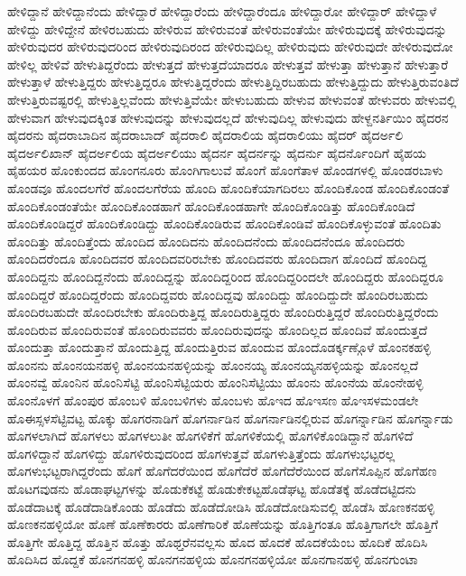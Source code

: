 {ಹೇಳಿದ್ದಾನೆ
ಹೇಳಿದ್ದಾನೆಂದು
ಹೇಳಿದ್ದಾರೆ
ಹೇಳಿದ್ದಾರೆಂದು
ಹೇಳಿದ್ದಾರೆಂದೂ
ಹೇಳಿದ್ದಾರೋ
ಹೇಳಿದ್ದಾರ್
ಹೇಳಿದ್ದಾಳೆ
ಹೇಳಿದ್ದು
ಹೇಳಿದ್ದೇನೆ
ಹೇಳಿರಬಹುದು
ಹೇಳಿರುವ
ಹೇಳಿರುವಂತೆ
ಹೇಳಿರುವಂತೆಯೇ
ಹೇಳಿರುವುದಕ್ಕೆ
ಹೇಳಿರುವುದನ್ನು
ಹೇಳಿರುವುದರ
ಹೇಳಿರುವುದರಿಂದ
ಹೇಳಿರುವುದಿರಂದ
ಹೇಳಿರುವುದಿಲ್ಲ
ಹೇಳಿರುವುದು
ಹೇಳಿರುವುದೇ
ಹೇಳಿರುವುದೋ
ಹೇಳಿಲ್ಲ
ಹೇಳಿವೆ
ಹೇಳುತಿದ್ದರೆಂದು
ಹೇಳುತ್ತದೆ
ಹೇಳುತ್ತದೆಯಾದರೂ
ಹೇಳುತ್ತವೆ
ಹೇಳುತ್ತಾ
ಹೇಳುತ್ತಾನೆ
ಹೇಳುತ್ತಾರೆ
ಹೇಳುತ್ತಾಳೆ
ಹೇಳುತ್ತಿದ್ದರು
ಹೇಳುತ್ತಿದ್ದರೂ
ಹೇಳುತ್ತಿದ್ದರೆಂದು
ಹೇಳುತ್ತಿದ್ದಿರಬಹುದು
ಹೇಳುತ್ತಿದ್ದುದು
ಹೇಳುತ್ತಿರುವಂತಿದೆ
ಹೇಳುತ್ತಿರುವಷ್ಟರಲ್ಲಿ
ಹೇಳುತ್ತಿಲ್ಲವೆಂದು
ಹೇಳುತ್ತಿವೆಯೇ
ಹೇಳುಬಹುದು
ಹೇಳುವ
ಹೇಳುವಂತೆ
ಹೇಳುವರು
ಹೇಳುವಲ್ಲಿ
ಹೇಳುವಾಗ
ಹೇಳುವುದಕ್ಕಿಂತ
ಹೇಳುವುದನ್ನು
ಹೇಳುವುದಲ್ಲದೆ
ಹೇಳುವುದಿಲ್ಲ
ಹೇಳುವುದು
ಹೇಳ್ದನರ್ತಿಯಿಂ
ಹೈದರನ
ಹೈದರನು
ಹೈದರಾಬಾದಿನ
ಹೈದರಾಬಾದ್
ಹೈದರಾಲಿ
ಹೈದರಾಲಿಯ
ಹೈದರಾಲಿಯು
ಹೈದರ್
ಹೈದರ್ಅಲಿ
ಹೈದರ್ಅಲಿಖಾನ್
ಹೈದರ್ಅಲಿಯ
ಹೈದರ್ಅಲಿಯು
ಹೈದರ್ನ
ಹೈದರ್ನನ್ನು
ಹೈದರ್ನು
ಹೈದರ್ನೊಂದಿಗೆ
ಹೈಹಯ
ಹೈಹಯರ
ಹೊಂಕುಂದದ
ಹೊಂಗನೂರು
ಹೊಂಗಿಗಾಲುವೆ
ಹೊಂಗೆ
ಹೊಂಗೆತಾಳ
ಹೊಂಡಗಳಲ್ಲಿ
ಹೊಂಡರಬಾಳು
ಹೊಂಡವೂ
ಹೊಂದಲಗೆರೆ
ಹೊಂದಲಗೆರೆಯ
ಹೊಂದಿ
ಹೊಂದಿಕೆಯಾಗದಿರಲು
ಹೊಂದಿಕೊಂಡ
ಹೊಂದಿಕೊಂಡಂತೆ
ಹೊಂದಿಕೊಂಡಂತೆಯೇ
ಹೊಂದಿಕೊಂಡಹಾಗೆ
ಹೊಂದಿಕೊಂಡಹಾಗೇ
ಹೊಂದಿಕೊಂಡಿತ್ತು
ಹೊಂದಿಕೊಂಡಿದೆ
ಹೊಂದಿಕೊಂಡಿದ್ದರೆ
ಹೊಂದಿಕೊಂಡಿದ್ದು
ಹೊಂದಿಕೊಂಡಿರುವ
ಹೊಂದಿಕೊಂಡಿವೆ
ಹೊಂದಿಕೊಳ್ಳುವಂತೆ
ಹೊಂದಿತು
ಹೊಂದಿತ್ತು
ಹೊಂದಿತ್ತೆಂದು
ಹೊಂದಿದ
ಹೊಂದಿದನು
ಹೊಂದಿದನೆಂದು
ಹೊಂದಿದನೆಂದೂ
ಹೊಂದಿದರು
ಹೊಂದಿದರೆಂದೂ
ಹೊಂದಿದವರ
ಹೊಂದಿದವರಿರಬೇಕು
ಹೊಂದಿದವರು
ಹೊಂದಿದಾಗ
ಹೊಂದಿದೆ
ಹೊಂದಿದ್ದ
ಹೊಂದಿದ್ದನು
ಹೊಂದಿದ್ದನೆಂದು
ಹೊಂದಿದ್ದನ್ನು
ಹೊಂದಿದ್ದರಿಂದ
ಹೊಂದಿದ್ದರಿಂದಲೇ
ಹೊಂದಿದ್ದರು
ಹೊಂದಿದ್ದರೂ
ಹೊಂದಿದ್ದರೆ
ಹೊಂದಿದ್ದರೆಂದು
ಹೊಂದಿದ್ದವರು
ಹೊಂದಿದ್ದವು
ಹೊಂದಿದ್ದು
ಹೊಂದಿದ್ದುದೇ
ಹೊಂದಿರಬಹುದು
ಹೊಂದಿರಬಹುದೇ
ಹೊಂದಿರಬೇಕು
ಹೊಂದಿರುತ್ತಿದ್ದ
ಹೊಂದಿರುತ್ತಿದ್ದರು
ಹೊಂದಿರುತ್ತಿದ್ದರೆ
ಹೊಂದಿರುತ್ತಿದ್ದರೆಂದು
ಹೊಂದಿರುವ
ಹೊಂದಿರುವಂತೆ
ಹೊಂದಿರುವವರು
ಹೊಂದಿರುವುದನ್ನು
ಹೊಂದಿಲ್ಲದ
ಹೊಂದಿವೆ
ಹೊಂದುತ್ತದೆ
ಹೊಂದುತ್ತಾ
ಹೊಂದುತ್ತಾನೆ
ಹೊಂದುತ್ತಿದ್ದ
ಹೊಂದುತ್ತಿರುವ
ಹೊಂದುವ
ಹೊಂದೊಡರ್ಕ್ಕಣ್ಗೊಳೆ
ಹೊಂನಕಹಳ್ಳಿ
ಹೊಂನನು
ಹೊಂನಯನಹಳ್ಳಿ
ಹೊಂನಯನಹಳ್ಳಿಯನ್ನು
ಹೊಂನಯ್ಯ
ಹೊಂನಯ್ಯನಹಳ್ಳಿಯನ್ನು
ಹೊಂನಲ್ಲದೆ
ಹೊಂನವ್ವೆ
ಹೊಂನಿನ
ಹೊಂನಿಸೆಟ್ಟಿ
ಹೊಂನಿಸೆಟ್ಟಿಯರು
ಹೊಂನಿಸೆಟ್ಟಿಯು
ಹೊಂನು
ಹೊಂನೆಯ
ಹೊಂನೇಹಳ್ಳಿ
ಹೊಂನೊಳಗೆ
ಹೊಂಪುರ
ಹೊಂಬಳಿ
ಹೊಂಬಳಿಗಳು
ಹೊಂಬಳು
ಹೊಇದ
ಹೊಇಸಣ
ಹೊಇಸಳಮಂಡಲೇ
ಹೊಈಸ್ಸಳಸೆಟ್ಟಿವಟ್ಟ
ಹೊಕ್ಕು
ಹೊಗರನಾಡಿಗೆ
ಹೊಗರ್ನಾಡಿನ
ಹೊಗರ್ನಾಡಿನಲ್ಲಿರುವ
ಹೊಗರ್ನ್ನಾಡಿನ
ಹೊಗರ್ನ್ನಾಡು
ಹೊಗಳಲಾಗಿದೆ
ಹೊಗಳಲು
ಹೊಗಳಲುತೀ
ಹೊಗಳಿಕೆಗೆ
ಹೊಗಳಿಕೆಯಲ್ಲಿ
ಹೊಗಳಿಕೊಂಡಿದ್ದಾನೆ
ಹೊಗಳಿದೆ
ಹೊಗಳಿದ್ದಾನೆ
ಹೊಗಳಿದ್ದು
ಹೊಗಳಿರುವುದರಿಂದ
ಹೊಗಳುತ್ತವೆ
ಹೊಗಳುತ್ತಿತ್ತೆಂದು
ಹೊಗಳುಭಟ್ಟರಲ್ಲ
ಹೊಗಳುಭಟ್ಟರಾಗಿದ್ದರೆಂದು
ಹೊಗೆ
ಹೊಗೆದರೆಯಿಂದ
ಹೊಗೆದೆರೆ
ಹೊಗೆದೆರೆಯಿಂದ
ಹೊಗೆಸೊಪ್ಪಿನ
ಹೊಗೆಹಣ
ಹೊಟಗವುಡನು
ಹೊಡಾಘಟ್ಟಗಳನ್ನು
ಹೊಡುಕೆಕಟ್ಟೆ
ಹೊಡುಕೇಕಟ್ಟಹೊಡೆಘಟ್ಟ
ಹೊಡೆತಕ್ಕೆ
ಹೊಡೆದಟ್ಟಿದನು
ಹೊಡೆದಾಟಕ್ಕೆ
ಹೊಡೆದಾಡಿಕೊಂಡು
ಹೊಡೆದು
ಹೊಡೆದೋಡಿಸಿ
ಹೊಡೆದೋಡಿಸುವಲ್ಲಿ
ಹೊಡೆಸಿ
ಹೊಣಕನಹಳ್ಳಿ
ಹೊಣಕನಹಳ್ಳಿಯೋ
ಹೊಣೆ
ಹೊಣೆಕಾರರು
ಹೊಣೆಗಾರಿಕೆ
ಹೊಣೆಯನ್ನು
ಹೊತ್ತಿಗಂತೂ
ಹೊತ್ತಿಗಾಗಲೇ
ಹೊತ್ತಿಗೆ
ಹೊತ್ತಿಗೇ
ಹೊತ್ತಿದ್ದ
ಹೊತ್ತಿನ
ಹೊತ್ತು
ಹೊಥ್ತರೆನವಲ್ಲಸು
ಹೊದ
ಹೊದಕೆ
ಹೊದಕೆಯೆಂಬ
ಹೊದಿಕೆ
ಹೊದಿಸಿ
ಹೊದಿಸಿದ
ಹೊದ್ದಕೆ
ಹೊನಗನಹಳ್ಳಿ
ಹೊನಗನಹಳ್ಳಿಯ
ಹೊನಗನಹಳ್ಳಿಯೋ
ಹೊನಗಾನಹಳ್ಳಿ
ಹೊನಗುಂಟಾ
}
